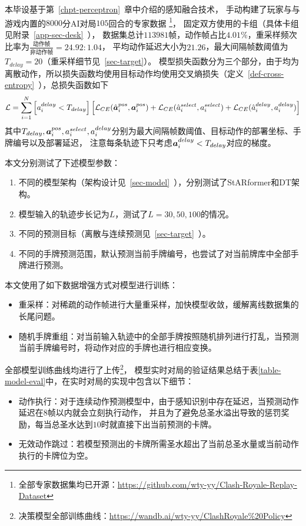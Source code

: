 本毕设基于第~\ref{chpt-perceptron}~章中介绍的感知融合技术，
手动构建了玩家与与游戏内置的$8000$分AI对局$105$回合的专家数据
\footnote{全部专家数据集均已开源：\url{https://github.com/wty-yy/Clash-Royale-Replay-Dataset}}，
固定双方使用的卡组（具体卡组见附录~\ref{app-sec-desk}~），
数据集总计$113981$帧，动作帧占比$4.01\%$，重采样频次比率为$\frac{\text{动作帧}}{\text{非动作帧}}=24.92:1.04$，
平均动作延迟大小为$21.26$，最大间隔帧数阈值为$T_{delay}=20$（重采样细节见~\ref{sec-target}）。
模型损失函数分为三个部分，由于均为离散动作，所以损失函数均使用目标动作均使用交叉熵损失（定义~\ref{def-cross-entropy}~），总损失函数如下
\begin{equation}
  \mathcal{L} =
  \sum_{\substack{i=1\\}}^N\left[a_i^{delay} < T_{delay}\right]\left[\mathcal{L}_{CE}(\hat{\boldsymbol{a}}_i^{pos}, \boldsymbol{a}_i^{pos})+
  \mathcal{L}_{CE}(\hat{a}_i^{select}, a_i^{select}) + 
  \mathcal{L}_{CE}(\hat{a}_i^{delay}, a_i^{delay})\right]
\end{equation}
其中$T_{delay},\boldsymbol{a}_i^{pos},a_i^{select},a_i^{delay}$分别为最大间隔帧数阈值、目标动作的部署坐标、手牌编号以及部署延迟，
注意每条轨迹下只考虑$\boldsymbol{a}_i^{delay} < T_{delay}$对应的梯度。

本文分别测试了下述模型参数：
\begin{enumerate}
  \item 不同的模型架构（架构设计见~\ref{sec-model}~），分别测试了StARformer和DT架构。
  \item 模型输入的轨迹步长记为$L$，测试了$L=30,50,100$的情况。
  \item 不同的预测目标（离散与连续预测见~\ref{sec-target}~）。
  \item 不同的手牌预测范围，默认预测当前手牌编号，也尝试了对当前牌库中全部手牌进行预测。
\end{enumerate}

本文使用了如下数据增强方式对模型进行训练：
\begin{itemize}
  \item 重采样：对稀疏的动作帧进行大量重采样，加快模型收敛，缓解离线数据集的长尾问题。
  \item 随机手牌重组：对当前输入轨迹中的全部手牌按照随机排列进行打乱，当预测当前手牌编号时，将动作对应的手牌也进行相应变换。
\end{itemize}

全部模型训练曲线均进行了上传\footnote{决策模型全部训练曲线：\url{https://wandb.ai/wty-yy/ClashRoyale\%20Policy}}，
模型实时对局的验证结果总结于表\ref{table-model-eval}中，在实时对局的实现中包含以下细节：
\begin{itemize}
  \item 动作执行：对于连续动作预测模型中，由于感知识别中存在延迟，当预测动作延迟在$8$帧以内就会立刻执行动作，
  并且为了避免总圣水溢出导致的惩罚奖励，每当总圣水达到$10$时就直接下出当前预测的卡牌。
  \item 无效动作跳过：若模型预测出的卡牌所需圣水超出了当前总圣水量或当前动作执行的卡牌位为空。
\end{itemize}

